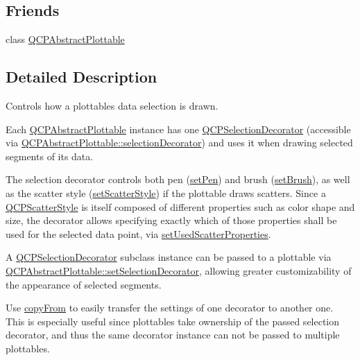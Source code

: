 \subsection*{Friends}
\begin{DoxyCompactItemize}
\item 
class \hyperlink{class_q_c_p_selection_decorator_a53cf0e76aca814550c796fed79e345d6}{Q\+C\+P\+Abstract\+Plottable}
\end{DoxyCompactItemize}


\subsection{Detailed Description}
Controls how a plottable\textquotesingle{}s data selection is drawn. 

Each \hyperlink{class_q_c_p_abstract_plottable}{Q\+C\+P\+Abstract\+Plottable} instance has one \hyperlink{class_q_c_p_selection_decorator}{Q\+C\+P\+Selection\+Decorator} (accessible via \hyperlink{class_q_c_p_abstract_plottable_a7861518e47ca0c6a0c386032c2db075e}{Q\+C\+P\+Abstract\+Plottable\+::selection\+Decorator}) and uses it when drawing selected segments of its data.

The selection decorator controls both pen (\hyperlink{class_q_c_p_selection_decorator_ac2c8192e1e294aa3a4a7f32a859e3d76}{set\+Pen}) and brush (\hyperlink{class_q_c_p_selection_decorator_aa74b626be518ea17055f918d423c8c2d}{set\+Brush}), as well as the scatter style (\hyperlink{class_q_c_p_selection_decorator_ab403a613289714ff4fd4a0c0371ab116}{set\+Scatter\+Style}) if the plottable draws scatters. Since a \hyperlink{class_q_c_p_scatter_style}{Q\+C\+P\+Scatter\+Style} is itself composed of different properties such as color shape and size, the decorator allows specifying exactly which of those properties shall be used for the selected data point, via \hyperlink{class_q_c_p_selection_decorator_a808c1607cd4e83869c04986e332455c0}{set\+Used\+Scatter\+Properties}.

A \hyperlink{class_q_c_p_selection_decorator}{Q\+C\+P\+Selection\+Decorator} subclass instance can be passed to a plottable via \hyperlink{class_q_c_p_abstract_plottable_a20e266ad646f8c4a7e4631040510e5d9}{Q\+C\+P\+Abstract\+Plottable\+::set\+Selection\+Decorator}, allowing greater customizability of the appearance of selected segments.

Use \hyperlink{class_q_c_p_selection_decorator_a467a8d5cfcab27e862a17c797ac27b8a}{copy\+From} to easily transfer the settings of one decorator to another one. This is especially useful since plottables take ownership of the passed selection decorator, and thus the same decorator instance can not be passed to multiple plottables.

